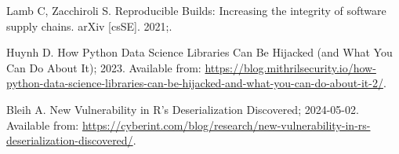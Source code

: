 \documentclass[11pt]{article}
\begin{document}
\begin{thebibliography}{10}
Lamb C, Zacchiroli S.
\newblock Reproducible Builds: Increasing the integrity of software supply
  chains.
\newblock arXiv [csSE]. 2021;.

Huynh D. How Python Data Science Libraries Can Be Hijacked (and What You Can Do
  About It); 2023.
\newblock Available from:
  \url{https://blog.mithrilsecurity.io/how-python-data-science-libraries-can-be-hijacked-and-what-you-can-do-about-it-2/}.

Bleih A. New Vulnerability in {R}'s Deserialization Discovered; 2024-05-02.
\newblock Available from:
  \url{https://cyberint.com/blog/research/new-vulnerability-in-rs-deserialization-discovered/}.

\end{thebibliography}
\end{document}
